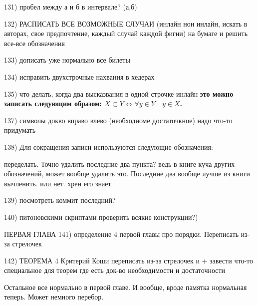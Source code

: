 131) пробел между а и б в интервале? (а,б) 

132) РАСПИСАТЬ ВСЕ ВОЗМОЖНЫЕ СЛУЧАИ (инлайн нон инлайн, искать в авторах, свое предпочтение, каждый случай каждой фигни) на бумаге и решить все-все обозначения

133) дописать уже нормально все билеты

134) исправить двухстрочные нахвания в хедерах

135) что делать, когда два высказвания в одной строчке инлайн   \textbf{это можно записать следующим образом: $X \subset Y \Longleftrightarrow \forall y\in Y\quad  y\in X$.}

137) символы докво вправо влево (необходиоме достаточкное) надо что-то придумать

138) Для сокращения записи используются следующие обозначения:

переделать. Точно удалить последние два пункта? ведь в книге куча других обозначений, может вообще удалить это. Последние два вообще лучше из книги вычленить. или нет. хрен его знает.

139) посмотреть коммит последний? 

140) питоновскими скриптами проверить всякие конструкции?)

ПЕРВАЯ ГЛАВА
141) определение 4 первой главы про порядки. Переписать из-за стрелочек

142) ТЕОРЕМА 4 Критерий Коши переписать из-за стрелочек и + завести что-то специальное для теорем где есть док-во необходимости и достаточности

Остальное все нормально в первой главе. И вообще, вроде памятка нормальная теперь. Может немного перебор.
